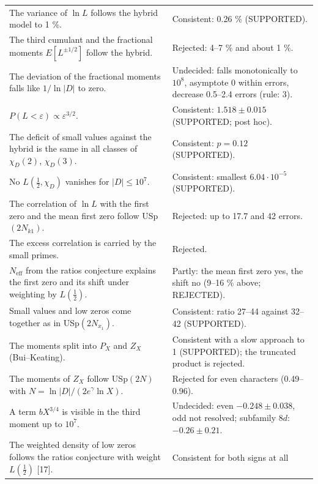 \documentclass[
  10pt,
]{article}
\begin{document}
{\begin{longtable}[]{@{}
  >{\raggedright\arraybackslash}p{}
  >{\raggedright\arraybackslash}p{}@{}}
The variance of \(\ln L\) follows the hybrid model to 1 \%. &
Consistent: 0.26 \% (SUPPORTED). \\ \addlinespace[2pt]
The third cumulant and the fractional moments \(E[L^{\pm1/2}]\) follow
the hybrid. & Rejected: 4--7 \% and about 1 \%. \\ \addlinespace[2pt]
The deviation of the fractional moments falls like \(1/\ln|D|\) to zero.
& Undecided: falls monotonically to \(10^8\), asymptote 0 within errors,
decrease 0.5--2.4 errors (rule: 3). \\ \addlinespace[2pt]
\(P(L < \varepsilon) \propto \varepsilon^{3/2}\). & Consistent:
\(1.518 \pm 0.015\) (SUPPORTED; post hoc). \\ \addlinespace[2pt]
The deficit of small values against the hybrid is the same in all
classes of \(\chi_D(2)\), \(\chi_D(3)\). & Consistent: \(p = 0.12\)
(SUPPORTED). \\ \addlinespace[2pt]
No \(L(\tfrac12, \chi_D)\) vanishes for \(|D| \le 10^7\). & Consistent:
smallest \(6.04\cdot10^{-5}\) (SUPPORTED). \\ \addlinespace[2pt]
The correlation of \(\ln L\) with the first zero and the mean first zero
follow USp\((2N_{k1})\). & Rejected: up to 17.7 and 42 errors. \\ \addlinespace[2pt]
The excess correlation is carried by the small primes. & Rejected. \\ \addlinespace[2pt]
\(N_{\mathrm{eff}}\) from the ratios conjecture explains the first zero
and its shift under weighting by \(L(\tfrac12)\). & Partly: the mean
first zero yes, the shift no (9--16 \% above; REJECTED). \\ \addlinespace[2pt]
Small values and low zeros come together as in USp\((2N_{x_1})\). &
Consistent: ratio 27--44 against 32--42 (SUPPORTED). \\ \addlinespace[2pt]
The moments split into \(P_X\) and \(Z_X\) (Bui--Keating). & Consistent
with a slow approach to 1 (SUPPORTED); the truncated product is
rejected. \\ \addlinespace[2pt]
The moments of \(Z_X\) follow USp\((2N)\) with
\(N = \ln|D|/(2e^\gamma\ln X)\). & Rejected for even characters
(0.49--0.96). \\ \addlinespace[2pt]
A term \(bX^{3/4}\) is visible in the third moment up to \(10^7\). &
Undecided: even \(-0.248 \pm 0.038\), odd not resolved; subfamily
\(8d\): \(-0.26 \pm 0.21\). \\ \addlinespace[2pt]
The weighted density of low zeros follows the ratios conjecture with
weight \(L(\tfrac12)\) {[}17{]}. & Consistent for both signs at all

\end{longtable}}
\end{document}
